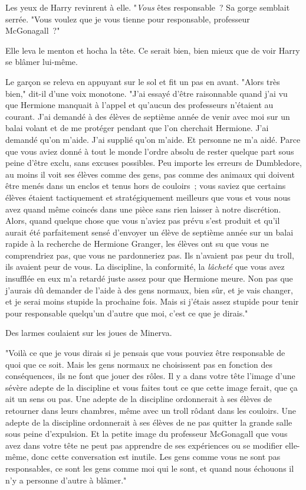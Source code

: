 Les yeux de Harry revinrent à elle. "\emph{Vous} êtes responsable~? Sa gorge semblait serrée. "Vous voulez que je vous tienne pour responsable, professeur McGonagall~?"

Elle leva le menton et hocha la tête. Ce serait bien, bien mieux que de voir Harry se blâmer lui-même.

Le garçon se releva en appuyant sur le sol et fit un pas en avant. "Alors très bien," dit-il d'une voix monotone. "J'ai essayé d'être raisonnable quand j'ai vu que Hermione manquait à l'appel et qu'aucun des professeurs n'étaient au courant. J'ai demandé à des élèves de septième année de venir avec moi sur un balai volant et de me protéger pendant que l'on cherchait Hermione. J'ai demandé qu'on m'aide. J'ai supplié qu'on m'aide. Et personne ne m'a aidé. Parce que vous aviez donné à tout le monde l'ordre absolu de rester quelque part sous peine d'être exclu, sans excuses possibles. Peu importe les erreurs de Dumbledore, au moins il voit ses élèves comme des gens, pas comme des animaux qui doivent être menés dans un enclos et tenus hors de couloirs~; vous saviez que certains élèves étaient tactiquement et stratégiquement meilleurs que vous et vous nous avez quand même coincés dans une pièce sans rien laisser à notre discrétion. Alors, quand quelque chose que vous n'aviez pas prévu s'est produit et qu'il aurait été parfaitement sensé d'envoyer un élève de septième année sur un balai rapide à la recherche de Hermione Granger, les élèves ont su que vous ne comprendriez pas, que vous ne pardonneriez pas. Ils n'avaient pas peur du troll, ils avaient peur de vous. La discipline, la conformité, la \emph{lâcheté} que vous avez insufflée en eux m'a retardé juste assez pour que Hermione meure. Non pas que j'aurais dû demander de l'aide à des gens normaux, bien sûr, et je vais changer, et je serai moins stupide la prochaine fois. Mais si j'étais assez stupide pour tenir pour responsable quelqu'un d'autre que moi, c'est ce que je dirais."

Des larmes coulaient sur les joues de Minerva.

"Voilà ce que je vous dirais si je pensais que vous pouviez être responsable de quoi que ce soit. Mais les gens normaux ne choisissent pas en fonction des conséquences, ils ne font que jouer des rôles. Il y a dans votre tête l'image d'une sévère adepte de la discipline et vous faites tout ce que cette image ferait, que ça ait un sens ou pas. Une adepte de la discipline ordonnerait à ses élèves de retourner dans leurs chambres, même avec un troll rôdant dans les couloirs. Une adepte de la discipline ordonnerait à ses élèves de ne pas quitter la grande salle sous peine d'expulsion. Et la petite image du professeur McGonagall que vous avez dans votre tête ne peut pas apprendre de ses expériences ou se modifier elle-même, donc cette conversation est inutile. Les gens comme vous ne sont pas responsables, ce sont les gens comme moi qui le sont, et quand nous échouons il n'y a personne d'autre à blâmer."

